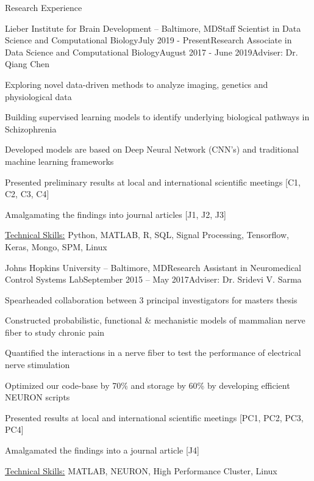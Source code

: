 \documentclass{resume}
\begin{document}
  \begin{rSection}{Research Experience}
\begin{rSubsectionPromotion}{Lieber Institute for Brain Development -- Baltimore, MD}{}{Staff Scientist in Data Science and Computational Biology}{July 2019 - Present}{Research Associate in Data Science and Computational Biology}{August 2017 - June 2019}{Adviser: Dr. Qiang Chen}
\item Exploring novel data-driven methods to analyze imaging, genetics and physiological data
\item Building supervised learning models to identify underlying biological pathways in Schizophrenia
\item Developed models are based on Deep Neural Network (CNN's) and traditional machine learning frameworks
\item Presented preliminary results at local and international scientific meetings [C1, C2, C3, C4]
\item Amalgamating the findings into journal articles [J1, J2, J3] 
\item \uline{Technical Skills:} Python, MATLAB, R, SQL, Signal Processing, Tensorflow, Keras, Mongo, SPM, Linux
    \end{rSubsectionPromotion}

    \begin{rSubsection}{Johns Hopkins University -- Baltimore, MD}{}{Research Assistant in Neuromedical Control Systems Lab}{September 2015 -- May 2017}{Adviser: Dr. Sridevi V. Sarma}
\item Spearheaded collaboration between 3 principal investigators for masters thesis
\item Constructed probabilistic, functional \& mechanistic models of mammalian nerve fiber to study chronic pain
\item Quantified the interactions in a nerve fiber to test the performance of electrical nerve stimulation
\item Optimized our code-base by 70\% and storage by 60\% by developing efficient NEURON scripts
\item Presented results at local and international scientific meetings [PC1, PC2, PC3, PC4]
\item Amalgamated the findings into a journal article [J4]
\item \uline{Technical Skills:} MATLAB, NEURON, High Performance Cluster, Linux
    \end{rSubsection}
  

\end{rSection}
\end{document}
